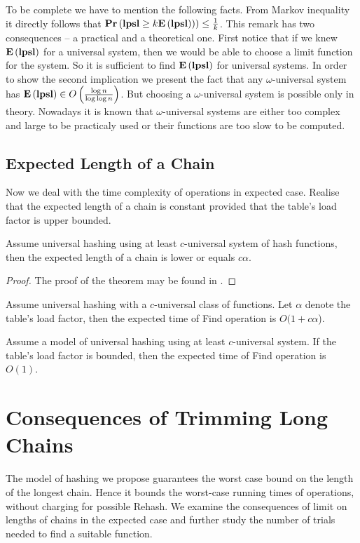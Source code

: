 To be complete we have to mention the following facts. From Markov inequality it directly follows that $\mathbf{Pr}\left(\mathbf{lpsl} \geq k \mathbf{E}\left(\mathbf{lpsl}\right))\right) \leq \frac{1}{k}$. This remark has two consequences -- a practical and a theoretical one. First notice that if we knew $\mathbf{E}\left(\mathbf{lpsl}\right)$ for a universal system, then we would be able to choose a limit function for the system. So it is sufficient to find $\mathbf{E}\left(\mathbf{lpsl}\right)$ for universal systems. In order to show the second implication we present the fact that any $\omega$-universal system has $\mathbf{E}\left(\mathbf{lpsl}\right) \in O\left(\frac{\log n}{\log \log n}\right)$. But choosing a $\omega$-universal system is possible only in theory. Nowadays it is known that $\omega$-universal systems are either too complex and large to be practicaly used or their functions are too slow to be computed.

\subsection{Expected Length of a Chain}
Now we deal with the time complexity of operations in expected case. Realise that the expected length of a chain is constant provided that the table's load factor is upper bounded. 
\begin{theorem}
\label{theorem-expected-chain-length-universal}
Assume universal hashing using at least $c$-universal system of hash functions, then the expected length of a chain is lower or equals $c \alpha$.
\begin{proof}
The proof of the theorem may be found in \cite{DBLP:journals/jcss/CarterW79}.
\end{proof}
\end{theorem}
\begin{corollary}
\label{corollary-c-universal-find}
Assume universal hashing with a $c$-universal class of functions. Let $\alpha$ denote the table's load factor, then the expected time of Find operation is $O(1 + c\alpha$).
\end{corollary}
\begin{corollary}
\label{corollary-find-time}
Assume a model of universal hashing using at least $c$-universal system. If the table's load factor is bounded, then the expected time of Find operation is $O(1)$.
\end{corollary}

\section{Consequences of Trimming Long Chains}
The model of hashing we propose guarantees the worst case bound on the length of the longest chain. Hence it bounds the worst-case running times of operations, without charging for possible Rehash. We examine the consequences of limit on lengths of chains in the expected case and further study the number of trials needed to find a suitable function. 

